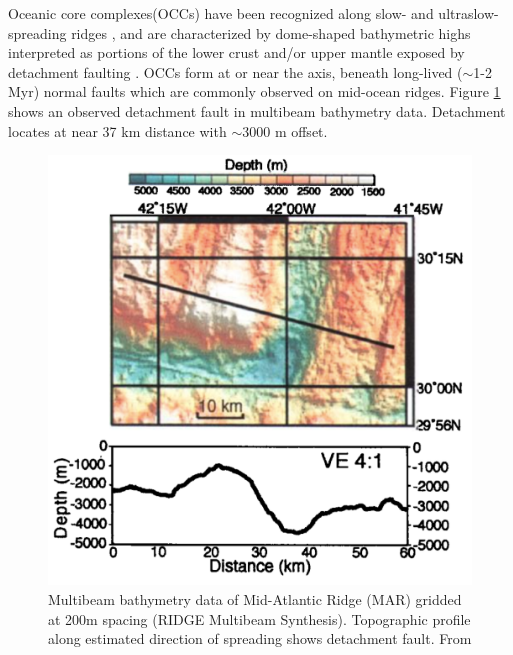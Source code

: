 \documentclass[letterpaper,12pt,notitle]{memphisthesis}                     %
\begin{document}

%
%
%

Oceanic core complexes(OCCs) have been recognized along slow- and ultraslow- spreading ridges \citep{Tucholke1998}, and are characterized by dome-shaped bathymetric highs interpreted as portions of the lower crust and/or upper mantle exposed by detachment faulting \citep{Tucholke1994}. OCCs form at or near the axis, beneath long-lived ($\sim$1-2 Myr) normal faults which are commonly observed on mid-ocean ridges. Figure \ref{fig:occ} shows an observed detachment fault in multibeam bathymetry data. Detachment locates at near 37 km distance with $\sim$3000 m offset.
%
\begin{figure}[!htb]
	\centering
	\includegraphics[width=0.6\linewidth]{./figs/occ.png}
	\caption{ Multibeam bathymetry data of Mid-Atlantic Ridge (MAR) gridded at 200m spacing (RIDGE Multibeam Synthesis). Topographic profile along estimated direction of spreading shows detachment fault. From \citet{Lavier2000}}
	\label{fig:occ}
\end{figure}
%
\end{document}
